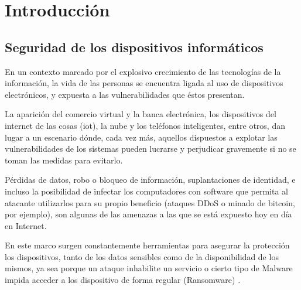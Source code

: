 \chapter{Introducción}

\section{Seguridad de los dispositivos informáticos}

En un contexto marcado por el explosivo crecimiento de las tecnologías de la información, la vida de las personas se encuentra ligada al uso de dispositivos electrónicos, y expuesta a las vulnerabilidades que éstos presentan.

La aparición del comercio virtual y la banca electrónica, los dispositivos del internet de las cosas (\acrshort{iot}), la nube y los teléfonos inteligentes, entre otros, dan lugar a un escenario dónde, cada vez más, aquellos dispuestos a explotar las vulnerabilidades de los sistemas pueden lucrarse y perjudicar gravemente si no se toman las medidas para evitarlo. 

Pérdidas de datos, robo o bloqueo de información, suplantaciones de identidad, e incluso la posibilidad de infectar los computadores con software que permita al atacante utilizarlos para su propio beneficio (ataques DDoS o minado de bitcoin, por ejemplo), son algunas de las amenazas a las que se está expuesto hoy en día en Internet.

En este marco surgen constantemente herramientas para asegurar la protección los dispositivos, tanto de los datos sensibles como de la disponibilidad de los mismos, ya sea porque un ataque inhabilite un servicio o cierto tipo de \Gls{Malware} impida acceder a los dispositivo de forma regular (\gls{Ransomware}) \cite{independiente, cnncert}. 

